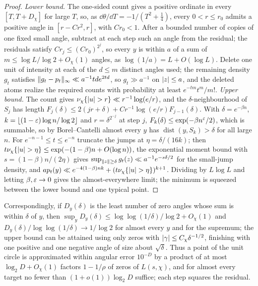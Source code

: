 \begin{proof}
\emph{Lower bound.} The one-sided count gives a positive ordinate in every $[T,T+D_\chi]$ for large $T$, so,
as $\dd\theta/\dd T=-1/(T^2+\tfrac14)$, every $0<r\le r_0$ admits a positive angle in $[r-Cr^2,r]$, with $Cr_0<1$. After
a bounded number of copies of one fixed small angle, subtract at each step such an angle from the
residual; the residuals satisfy $Cr_j\le(Cr_0)^{2^j}$, so every $y$ is within $a$ of a sum of
$m\le\log L/\log2+O_\chi(1)$ angles, as $\log(1/a)=L+O(\log L)$. Delete one unit of intensity at each of the $d\le m$
distinct angles used; the remaining density $g_t$ satisfies $\lVert g_t-p_t\rVert_\infty\ll a^{-1}tde^{2td}$, so $g_t\gg a^{-1}$ on
$\lvert z\rvert\le a$, and the deleted atoms realize the required counts with probability at least $e^{-tm}t^m/m!$.
\emph{Upper bound.} The count gives $\nu_\chi\{\lvert u\rvert>r\}\ll r^{-1}\log(e/r)$, and the $\delta$-neighbourhood of $S_j$ has
length $F_j(\delta)\le2(jr+\delta)+Cr^{-1}\log(e/r)F_{j-1}(\delta)$. With $\delta=e^{-\beta n}$, $k=\lfloor(1-\varepsilon)\log n/\log2\rfloor$ and
$r=\delta^{2^{-j}}$ at step $j$, $F_k(\delta)\le\exp(-\beta n^\varepsilon/2)$, which is summable, so by Borel--Cantelli almost every $y$
has $\operatorname{dist}(y,S_k)>\delta$ for all large $n$. For $e^{-n-1}\le t\le e^{-n}$ truncate the jumps at $\eta=\delta/(16k)$; then
$t\nu_\chi\{\lvert u\rvert>\eta\}\le\exp(-(1-\beta)n+O(\log n))$, the exponential moment bound with $s=(1-\beta)n/(2\eta)$ gives
$\sup_{\lVert z\rVert\ge\delta}g_t(z)\ll a^{-1}e^{-s\delta/2}$ for the small-jump density, and
$ap_t(y)\ll e^{-4(1-\beta)nk}+(t\nu_\chi\{\lvert u\rvert>\eta\})^{k+1}$. Dividing by $L\log L$ and letting $\beta,\varepsilon\to0$ gives the
almost-everywhere limit; the minimum is squeezed between the lower bound and one typical point.
\end{proof}

Correspondingly, if $D_y(\delta)$ is the least number of zero angles whose sum is within $\delta$ of $y$, then
$\sup_yD_y(\delta)\le\log\log(1/\delta)/\log2+O_\chi(1)$ and $D_y(\delta)/\log\log(1/\delta)\to1/\log2$ for almost every $y$ and for
the supremum; the upper bound can be attained using only zeros with $\lvert\gamma\rvert\le C_\chi\delta^{-1/2}$, finishing with one
positive and one negative angle of size about $\sqrt\delta$. Thus a point of the unit circle is approximated
within angular error $10^{-D}$ by a product of at most $\log_2D+O_\chi(1)$ factors $1-1/\rho$ of zeros of $L(s,\chi)$,
and for almost every target no fewer than $(1+o(1))\log_2D$ suffice; each step squares the residual.

